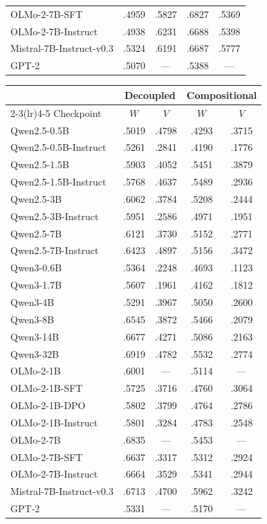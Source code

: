 \begin{table}[h]
\begin{tabular}{l*{4}{c}}
OLMo-2-7B-SFT & .4959 & .5827 & .6827 & .5369 \\
OLMo-2-7B-Instruct & .4938 & .6231 & .6688 & .5398 \\
\addlinespace
Mistral-7B-Instruct-v0.3 & .5324 & .6191 & .6687 & .5777 \\
 GPT-2 & .5070 & --- & .5388 & --- \\
\bottomrule
\end{tabular}
\vspace{4pt}
\begin{tabular}{l*{4}{c}}
\toprule
 & \multicolumn{2}{c}{Decoupled} & \multicolumn{2}{c}{Compositional} \\
\cmidrule(lr){2-3}\cmidrule(lr){4-5}
Checkpoint & $W$ & $V$ & $W$ & $V$ \\
\midrule
{} Qwen2.5-0.5B & .5019 & .4798 & .4293 & .3715 \\
Qwen2.5-0.5B-Instruct & .5261 & .2841 & .4190 & .1776 \\
 Qwen2.5-1.5B & .5903 & .4052 & .5451 & .3879 \\
Qwen2.5-1.5B-Instruct & .5768 & .4637 & .5489 & .2936 \\
 Qwen2.5-3B & .6062 & .3784 & .5208 & .2444 \\
Qwen2.5-3B-Instruct & .5951 & .2586 & .4971 & .1951 \\
 Qwen2.5-7B & .6121 & .3730 & .5152 & .2771 \\
Qwen2.5-7B-Instruct & .6423 & .4897 & .5156 & .3472 \\
\addlinespace
Qwen3-0.6B & .5364 & .2248 & .4693 & .1123 \\
Qwen3-1.7B & .5607 & .1961 & .4162 & .1812 \\
Qwen3-4B & .5291 & .3967 & .5050 & .2600 \\
Qwen3-8B & .6545 & .3872 & .5466 & .2079 \\
Qwen3-14B & .6677 & .4271 & .5086 & .2163 \\
Qwen3-32B & .6919 & .4782 & .5532 & .2774 \\
\addlinespace
{} OLMo-2-1B & .6001 & --- & .5114 & --- \\
OLMo-2-1B-SFT & .5725 & .3716 & .4760 & .3064 \\
OLMo-2-1B-DPO & .5802 & .3799 & .4764 & .2786 \\
OLMo-2-1B-Instruct & .5801 & .3284 & .4783 & .2548 \\
 OLMo-2-7B & .6835 & --- & .5453 & --- \\
OLMo-2-7B-SFT & .6637 & .3317 & .5312 & .2924 \\
OLMo-2-7B-Instruct & .6664 & .3529 & .5341 & .2944 \\
\addlinespace
Mistral-7B-Instruct-v0.3 & .6713 & .4700 & .5962 & .3242 \\
 GPT-2 & .5331 & --- & .5170 & --- \\
\bottomrule
\end{tabular}
\end{table}
